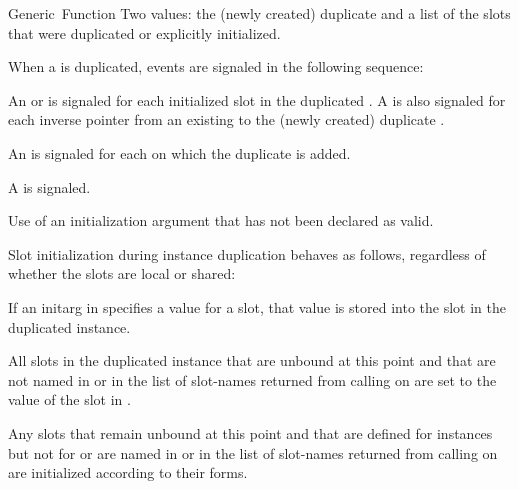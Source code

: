 \documentclass[10pt,twoside,english,pdftex]{article}
\begin{document}
\begin{functiondoc}{Generic~Function}
\fnreturns Two values: the (newly created) duplicate  and a
list of the slots that were duplicated or explicitly initialized.

\fnevents
{}%
%
%
%
%
%
%
%
%
%
%
%
When a  is duplicated, events are signaled in the
following sequence: 
\begin{tightenumerate}
\item An  or  is
  signaled for each initialized slot in the duplicated
  .  A  is also signaled for
  each inverse pointer from an existing  to the
  (newly created) duplicate .
\item An  is signaled
  for each  on which the duplicate
   is added.
\item A  is signaled.
\end{tightenumerate}

\fnerrors
%
Use of an initialization argument that has not been declared as valid.

%
%
%
\fndescription 
%
Slot initialization during instance duplication behaves as follows, regardless
of whether the slots are local or shared:
%
\begin{tightitemize}
\item If an initarg in  specifies a value for a slot, that
  value is stored into the slot in the duplicated instance.
\item All slots in the duplicated instance that are unbound at this point and
  that are not named in  or in the list of
  slot-names returned from calling
   on  are
  set to the value of the slot in .
\item Any slots that remain unbound at this point and that are defined for
   instances but not for  or are named in
   or in the list of slot-names returned from
  calling  on
   are initialized according to their 
  forms.
\end{tightitemize}


\end{functiondoc}
\end{document}
